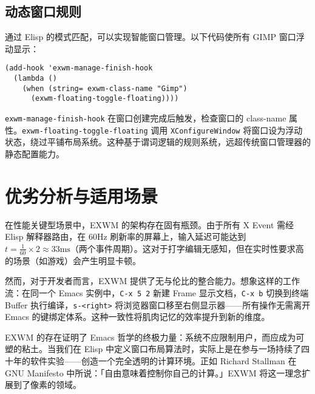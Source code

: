 \section{动态窗口规则}
通过 Elisp 的模式匹配，可以实现智能窗口管理。以下代码使所有 GIMP 窗口浮动显示：\par
\begin{lstlisting}[language=elisp]
(add-hook 'exwm-manage-finish-hook
  (lambda ()
    (when (string= exwm-class-name "Gimp")
      (exwm-floating-toggle-floating))))
\end{lstlisting}
\verb!exwm-manage-finish-hook! 在窗口创建完成后触发，检查窗口的 class-name 属性。\verb!exwm-floating-toggle-floating! 调用 \verb!XConfigureWindow! 将窗口设为浮动状态，绕过平铺布局系统。这种基于谓词逻辑的规则系统，远超传统窗口管理器的静态配置能力。\par
\chapter{优劣分析与适用场景}
在性能关键型场景中，EXWM 的架构存在固有瓶颈。由于所有 X Event 需经 Elisp 解释器路由，在 60Hz 刷新率的屏幕上，输入延迟可能达到 $t = \frac{1}{60} \times 2 \approx 33\text{ms}$（两个事件周期）。这对于打字编辑无感知，但在实时性要求高的场景（如游戏）会产生明显卡顿。\par
然而，对于开发者而言，EXWM 提供了无与伦比的整合能力。想象这样的工作流：在同一个 Emacs 实例中，\verb!C-x 5 2! 新建 Frame 显示文档，\verb!C-x b! 切换到终端 Buffer 执行编译，\verb!s-<right>! 将浏览器窗口移至右侧显示器——所有操作无需离开 Emacs 的键绑定体系。这种一致性将肌肉记忆的效率提升到新的维度。\par
EXWM 的存在证明了 Emacs 哲学的终极力量：系统不应限制用户，而应成为可塑的粘土。当我们在 Elisp 中定义窗口布局算法时，实际上是在参与一场持续了四十年的软件实验——创造一个完全透明的计算环境。正如 Richard Stallman 在 GNU Manifesto 中所说：「自由意味着控制你自己的计算。」EXWM 将这一理念扩展到了像素的领域。\par
